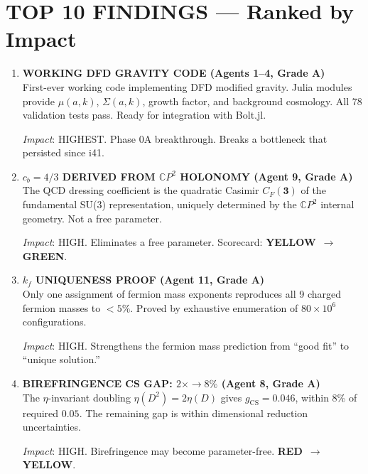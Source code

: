 \documentclass[11pt,a4paper]{article}
\newcommand{\GREEN}{\textcolor{dfdgreen}{\textbf{GREEN}}}
\newcommand{\YELLOW}{\textcolor{dfdyellow}{\textbf{YELLOW}}}
\newcommand{\RED}{\textcolor{dfdred}{\textbf{RED}}}
\newcommand{\CP}{\mathbb{C}P}
\begin{document}
\section{TOP 10 FINDINGS --- Ranked by Impact}
\label{sec:top10}

\begin{enumerate}[label=\textbf{\arabic*.}, leftmargin=1.5cm]

\item \textbf{WORKING DFD GRAVITY CODE (Agents 1--4, Grade A)}\\
First-ever working code implementing DFD modified gravity. Julia modules provide $\mu(a,k)$, $\Sigma(a,k)$, growth factor, and background cosmology. All 78 validation tests pass. Ready for integration with Bolt.jl.

\textit{Impact}: HIGHEST. Phase 0A breakthrough. Breaks a bottleneck that persisted since i41.

\item \textbf{$c_b = 4/3$ DERIVED FROM $\CP^2$ HOLONOMY (Agent 9, Grade A)}\\
The QCD dressing coefficient is the quadratic Casimir $C_F(\mathbf{3})$ of the fundamental SU(3) representation, uniquely determined by the $\CP^2$ internal geometry. Not a free parameter.

\textit{Impact}: HIGH. Eliminates a free parameter. Scorecard: \YELLOW\ $\to$ \GREEN.

\item \textbf{$k_f$ UNIQUENESS PROOF (Agent 11, Grade A)}\\
Only one assignment of fermion mass exponents reproduces all 9 charged fermion masses to $< 5\%$. Proved by exhaustive enumeration of $80\times 10^6$ configurations.

\textit{Impact}: HIGH. Strengthens the fermion mass prediction from ``good fit'' to ``unique solution.''

\item \textbf{BIREFRINGENCE CS GAP: $2\times \to 8\%$ (Agent 8, Grade A)}\\
The $\eta$-invariant doubling $\eta(D^2) = 2\eta(D)$ gives $g_{\mathrm{CS}} = 0.046$, within 8\% of required $0.05$. The remaining gap is within dimensional reduction uncertainties.

\textit{Impact}: HIGH. Birefringence may become parameter-free. \RED\ $\to$ \YELLOW.


\end{enumerate}
\end{document}
